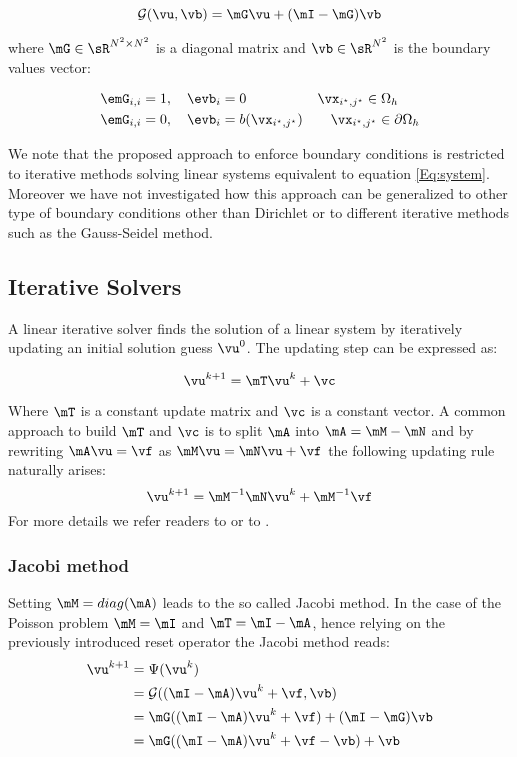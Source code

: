 \documentclass{article} %
\begin{document}
\begin{equation*}
    \mathcal{G}(\vu, \vb) = \mG \vu + (\mI-\mG)\vb
\end{equation*}

where $\mG \in \sR^{N^2\times N^2}$ is a diagonal matrix and $\vb \in \sR^{N^2}$ is the boundary values vector:

\begin{align*}
    \emG_{i,i} &= 1, \quad \evb_{i} = 0 \quad \; \quad \;\;\;\quad \quad \vx_{i^{\star},j^{\star}}\in \Omega_h \\
    \emG_{i,i} &= 0, \quad \evb_{i} = b(\vx_{i^{\star},j^{\star}})  \qquad \vx_{i^{\star},j^{\star}}\in \partial\Omega_h
\end{align*}

We note that the proposed approach to enforce boundary conditions is restricted to iterative methods solving linear systems equivalent to equation \ref{Eq:system}.
Moreover we have not investigated how this approach can be generalized to other type of boundary conditions other than Dirichlet or to different iterative methods such as the Gauss-Seidel method.

\subsection{Iterative Solvers}
A linear iterative solver finds the solution of a linear system by iteratively updating an initial solution guess $\vu^0$.
The updating step can be expressed as:

\begin{equation*}
\vu^{k+1} = \mT\vu^k + \vc
\end{equation*}

Where $\mT$ is a constant update matrix and $\vc$ is a constant vector.
A common approach to build $\mT$ and $\vc$ is to split $\mA$ into $\mA = \mM-\mN$ and by rewriting $\mA\vu=\vf$ as $\mM\vu=\mN\vu + \vf$ the following updating rule naturally arises:
\begin{equation*}
\vu^{k+1} = \mM^{-1}\mN\vu^k + \mM^{-1}\vf
\end{equation*}
For more details we refer readers to \cite{leveque} or to \cite{original_paper}.

\subsubsection{Jacobi method}
Setting $\mM = diag(\mA)$ leads to the so called Jacobi method. In the case of the Poisson problem $\mM=\mI$ and $\mT=\mI-\mA$, hence relying on the previously introduced reset operator the Jacobi method reads:
\begin{align*}
\vu^{k+1} &= \Psi(\vu^k)\\
          &= \mathcal{G}((\mI-\mA)\vu^k + \vf, \vb)\\
          &= \mG((\mI-\mA)\vu^k + \vf) + (\mI-\mG)\vb\\
          &= \mG((\mI-\mA)\vu^k + \vf-\vb) + \vb
\label{jacobiMatrix}
\end{align*}
\end{document}
